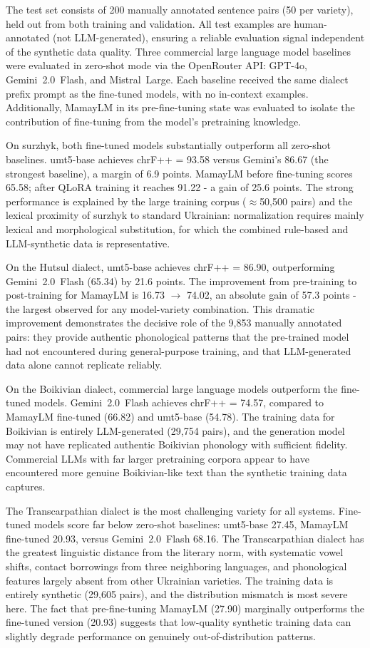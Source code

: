 \documentclass[14pt]{extarticle}
\begin{document}
The test set consists of 200 manually annotated sentence pairs (50 per variety), held out from
both training and validation. All test examples are human-annotated (not LLM-generated), ensuring
a reliable evaluation signal independent of the synthetic data quality. Three commercial large
language model baselines were evaluated in zero-shot mode via the OpenRouter API: GPT-4o,
Gemini~2.0~Flash, and Mistral~Large. Each baseline received the same dialect prefix prompt as
the fine-tuned models, with no in-context examples. Additionally, MamayLM in its pre-fine-tuning
state was evaluated to isolate the contribution of fine-tuning from the model's pretraining
knowledge.

On surzhyk, both fine-tuned models substantially outperform all zero-shot baselines. umt5-base
achieves chrF++ = 93.58 versus Gemini's 86.67 (the strongest baseline), a margin of 6.9 points.
MamayLM before fine-tuning scores 65.58; after QLoRA training it reaches 91.22 - a gain of 25.6
points. The strong performance is explained by the large training corpus (${\approx}$50,500 pairs)
and the lexical proximity of surzhyk to standard Ukrainian: normalization requires mainly lexical
and morphological substitution, for which the combined rule-based and LLM-synthetic data is
representative.

On the Hutsul dialect, umt5-base achieves chrF++ = 86.90, outperforming Gemini~2.0~Flash (65.34)
by 21.6 points. The improvement from pre-training to post-training for MamayLM is
16.73 $\rightarrow$ 74.02, an absolute gain of 57.3 points - the largest observed for any
model-variety combination. This dramatic improvement demonstrates the decisive role of the 9,853
manually annotated pairs: they provide authentic phonological patterns that the pre-trained model
had not encountered during general-purpose training, and that LLM-generated data alone cannot
replicate reliably.

On the Boikivian dialect, commercial large language models outperform the fine-tuned models.
Gemini~2.0~Flash achieves chrF++ = 74.57, compared to MamayLM fine-tuned (66.82) and umt5-base
(54.78). The training data for Boikivian is entirely LLM-generated (29,754 pairs), and the
generation model may not have replicated authentic Boikivian phonology with sufficient fidelity.
Commercial LLMs with far larger pretraining corpora appear to have encountered more genuine
Boikivian-like text than the synthetic training data captures.

The Transcarpathian dialect is the most challenging variety for all systems. Fine-tuned models
score far below zero-shot baselines: umt5-base 27.45, MamayLM fine-tuned 20.93, versus
Gemini~2.0~Flash 68.16. The Transcarpathian dialect has the greatest linguistic distance from the
literary norm, with systematic vowel shifts, contact borrowings from three neighboring languages,
and phonological features largely absent from other Ukrainian varieties. The training data is
entirely synthetic (29,605 pairs), and the distribution mismatch is most severe here. The fact
that pre-fine-tuning MamayLM (27.90) marginally outperforms the fine-tuned version (20.93)
suggests that low-quality synthetic training data can slightly degrade performance on genuinely
out-of-distribution patterns.
\end{document}
